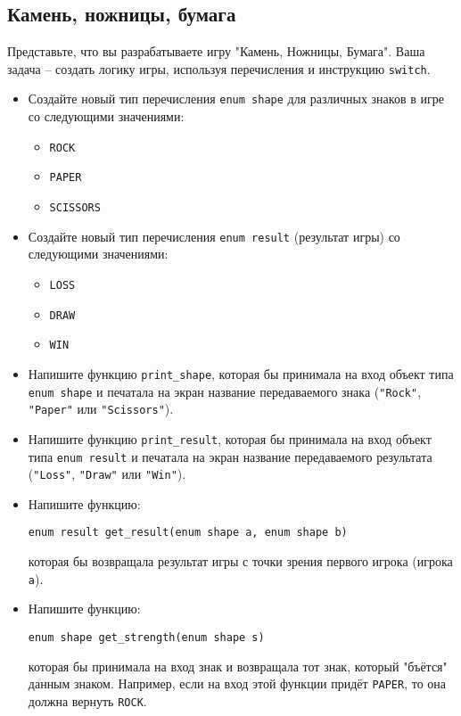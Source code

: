 \documentclass{article}
\begin{document}
\subsection{Камень, ножницы, бумага}
Представьте, что вы разрабатываете игру "Камень, Ножницы, Бумага"{}. Ваша задача -- создать логику игры, используя перечисления и инструкцию \texttt{switch}.
\begin{itemize}
\item Создайте новый тип перечисления \texttt{enum shape} для различных знаков в игре со следующими значениями:
\begin{itemize}
\item \texttt{ROCK}
\item \texttt{PAPER}
\item \texttt{SCISSORS}
\end{itemize}

\item Создайте новый тип перечисления \texttt{enum result} (результат игры) со следующими значениями:
\begin{itemize}
\item \texttt{LOSS}
\item \texttt{DRAW}
\item \texttt{WIN}
\end{itemize}

\item Напишите функцию \texttt{print\_shape}, которая бы принимала на вход объект типа \texttt{enum shape} и печатала на экран название передаваемого знака (\texttt{"Rock"{}}, \texttt{"Paper"{}} или \texttt{"Scissors"{}}).
\item Напишите функцию \texttt{print\_result}, которая бы принимала на вход объект типа \texttt{enum result} и печатала на экран название передаваемого результата (\texttt{"Loss"{}}, \texttt{"Draw"{}} или \texttt{"Win"{}}).
\item Напишите функцию:
\begin{lstlisting}
enum result get_result(enum shape a, enum shape b)
\end{lstlisting}
которая бы возвращала результат игры с точки зрения первого игрока (игрока \texttt{a}).

\item Напишите функцию:
\begin{lstlisting}
enum shape get_strength(enum shape s)
\end{lstlisting}
которая бы принимала на вход знак и возвращала тот знак, который "бъётся"{} данным знаком. Например, если на вход этой функции придёт \texttt{PAPER}, то она должна вернуть \texttt{ROCK}.

\end{itemize}
\end{document}

